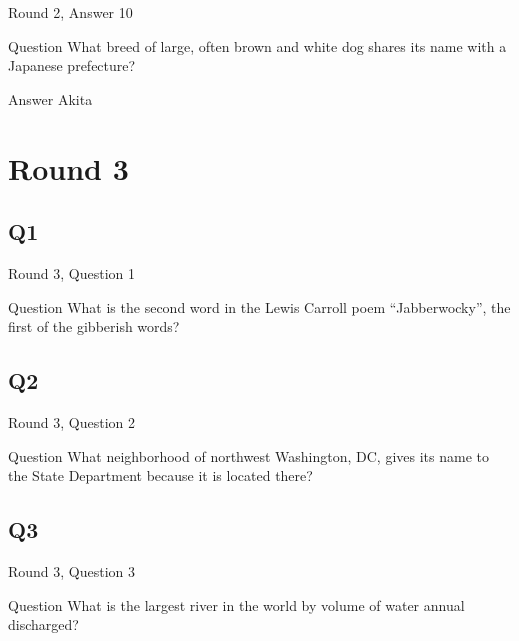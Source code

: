 \documentclass[11pt]{beamer}
\begin{document}
\begin{frame}[t]{Round 2, Answer 10}
\vspace{2em}
\begin{block}{Question}
What breed of large, often brown and white dog shares its name with a Japanese prefecture\@?
\end{block}
\pause{}
\begin{block}{Answer}
Akita
\end{block}
\end{frame}
    

\section{Round 3}
    

\subsection*{Q1}
\begin{frame}[t]{Round 3, Question 1}
\vspace{2em}
\begin{block}{Question}
What is the second word in the Lewis Carroll poem ``Jabberwocky'', the first of the gibberish words\@?
\end{block}
\end{frame}
    

\subsection*{Q2}
\begin{frame}[t]{Round 3, Question 2}
\vspace{2em}
\begin{block}{Question}
What neighborhood of northwest Washington, DC, gives its name to the State Department because it is located there\@?
\end{block}
\end{frame}
    

\subsection*{Q3}
\begin{frame}[t]{Round 3, Question 3}
\vspace{2em}
\begin{block}{Question}
What is the largest river in the world by volume of water annual discharged\@?
\end{block}
\end{frame}
    
\end{document}
